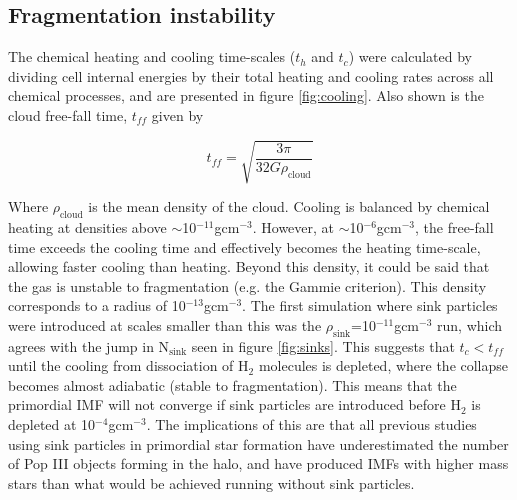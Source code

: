 \documentclass[fleqn,usenatbib]{mnras}
\begin{document}
\subsection{Fragmentation instability}
The chemical heating and cooling time-scales ($t_h$ and $t_c$) were calculated by dividing cell internal energies by their total heating and cooling rates across all chemical processes, and are presented in figure \ref{fig:cooling}. Also shown is the cloud free-fall time, $t_{ff}$ given by 

\begin{equation}
t_{ff} = \sqrt{\frac{3\pi}{32G\rho_{\text{cloud}}}}
\end{equation}

Where $\rho_{\text{cloud}}$ is the mean density of the cloud. Cooling is balanced by chemical heating at densities above $\sim$10$^{-11}$gcm$^{-3}$. However, at $\sim$10$^{-6}$gcm$^{-3}$, the free-fall time exceeds the cooling time and effectively becomes the heating time-scale, allowing faster cooling than heating. Beyond this density, it could be said that the gas is unstable to fragmentation (e.g. the Gammie criterion). This density corresponds to a radius of 10$^{-13}$gcm$^{-3}$. The first simulation where sink particles were introduced at scales smaller than this was the $\rho_{\text{sink}}$=10$^{-11}$gcm$^{-3}$ run, which agrees with the jump in N$_{\text{sink}}$ seen in figure \ref{fig:sinks}. This suggests that $t_c < t_{ff}$ until the cooling from dissociation of H$_{2}$ molecules is depleted, where the collapse becomes almost adiabatic (stable to fragmentation). This means that the primordial IMF will not converge if sink particles are introduced before H$_{2}$ is depleted at 10$^{-4}$gcm$^{-3}$. The implications of this are that all previous studies using sink particles in primordial star formation have underestimated the number of Pop III objects forming in the halo, and have produced IMFs with higher mass stars than what would be achieved running without sink particles.
\end{document}
